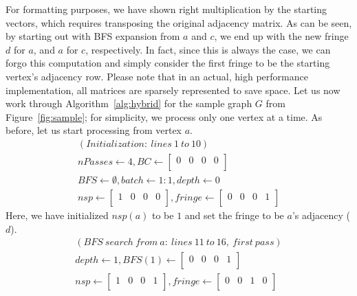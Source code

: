 %
For formatting purposes, we have shown right multiplication by the starting
vectors, which requires transposing the original adjacency matrix.
%
As can be seen, by starting out with BFS expansion from $a$ and $c$, we end 
up with the new fringe $d$ for $a$, and $a$ for $c$, respectively.
%
In fact, since this is always the case, we can forgo this computation and
simply consider the first fringe to be the starting vertex's adjacency row.
%
Please note that in an actual, high performance implementation, all matrices
are sparsely represented to save space.
%
Let us now work through Algorithm~\ref{alg:hybrid} for the sample graph $G$ 
from Figure~\ref{fig:sample}; for simplicity, we process only one vertex at a
time.
%
As before, let us start processing from vertex $a$.
%
\begin{align*}
(Initialization:\ lines\ 1\ to\ 10) \\
nPasses\leftarrow{}4,
BC\leftarrow{}\left[\begin{array}{cccc}0 & 0 & 0 & 0 \\\end{array} \right]\\
BFS\leftarrow{}\emptyset{}, batch\leftarrow{}1:1, depth\leftarrow{}0\\
nsp\leftarrow{}\left[\begin{array}{cccc}1 & 0 & 0 & 0 \\\end{array} \right],
fringe\leftarrow{}\left[\begin{array}{cccc}0 & 0 & 0 & 1 \\\end{array} \right]
\end{align*}
%
Here, we have initialized $nsp(a)$ to be $1$ and set the fringe to be $a$'s
adjacency ($d$).
%
\begin{align*}
(BFS\ search\ from\ a:\ lines\ 11\ to\ 16,\ first\ pass) \\
depth\leftarrow{}1,
BFS(1)\leftarrow{}\left[\begin{array}{cccc}0 & 0 & 0 & 1 \\\end{array} \right]\\
nsp\leftarrow{}\left[\begin{array}{cccc}1 & 0 & 0 & 1 \\\end{array} \right],
fringe\leftarrow{}\left[\begin{array}{cccc}0 & 0 & 1 & 0 \\\end{array} \right]
\end{align*}
